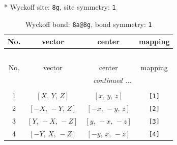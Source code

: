 \documentclass[fleqn,8pt]{jsarticle}
\begin{document}
* Wyckoff site: {\tt 8g}, site symmetry: {\tt 1}
\renewcommand{\arraystretch}{1.2}
\begin{longtable}{cccc}
\caption{Wyckoff bond: {\tt 8a@8g}, bond symmetry: {\tt 1}}
 \\
 \hline \hline
No. & vector & center & mapping \\ \hline \endfirsthead

\multicolumn{3}{l}{\tablename\ \thetable{}} \\
 \hline \hline
No. & vector & center & mapping \\ \hline \endhead

 \hline \hline
\multicolumn{3}{r}{\footnotesize\it continued ...} \\ \endfoot

 \hline \hline
\multicolumn{3}{r}{} \\ \endlastfoot

1 & $\left[ X,\, Y,\, Z \right]$ & $\left[ x,\, y,\, z \right]$ & {\tt [1]} \\ \hline
2 & $\left[ - X,\, - Y,\, Z \right]$ & $\left[ - x,\, - y,\, z \right]$ & {\tt [2]} \\ \hline
3 & $\left[ Y,\, - X,\, - Z \right]$ & $\left[ y,\, - x,\, - z \right]$ & {\tt [3]} \\ \hline
4 & $\left[ - Y,\, X,\, - Z \right]$ & $\left[ - y,\, x,\, - z \right]$ & {\tt [4]} \\
\end{longtable}
\end{document}
